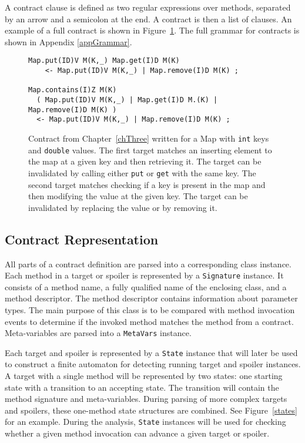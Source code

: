 A contract clause is defined as two regular expressions over methods, separated
by an arrow and a semicolon at the end. A contract is then a list of clauses. An
example of a full contract is shown in Figure~\ref{contract}. The full grammar
for contracts is shown in Appendix \ref{appGrammar}.

\begin{figure}[hbt]
    \label{contract}
    \begin{lstlisting}
Map.put(ID)V M(K,_) Map.get(I)D M(K)
    <- Map.put(ID)V M(K,_) | Map.remove(I)D M(K) ;

Map.contains(I)Z M(K)
  ( Map.put(ID)V M(K,_) | Map.get(I)D M.(K) | Map.remove(I)D M(K) )
  <- Map.put(ID)V M(K,_) | Map.remove(I)D M(K) ;
\end{lstlisting}
    \caption{Contract from Chapter~\ref{chThree} written for a Map with
    \texttt{int} keys and \texttt{double} values. The first target matches an
    inserting element to the map at a given key and then retrieving it. The
    target can be invalidated by calling either \texttt{put} or \texttt{get}
    with the same key. The second target matches checking if a key is present in
    the map and then modifying the value at the given key. The target can be
    invalidated by replacing the value or by removing it.}
\end{figure}

\subsection{Contract Representation}
All parts of a contract definition are parsed into a corresponding class
instance. Each method in a target or spoiler is represented by a
\texttt{Signature} instance. It consists of a method name, a fully qualified
name of the enclosing class, and a method descriptor. The method descriptor
contains information about parameter types. The main purpose of this class is to
be compared with method invocation events to determine if the invoked method
matches the method from a contract. Meta-variables are parsed into a
\texttt{MetaVars} instance.

Each target and spoiler is represented by a \texttt{State} instance that will
later be used to construct a finite automaton for detecting running target and
spoiler instances. A target with a single method will be represented by two
states: one starting state with a transition to an accepting state. The
transition will contain the method signature and meta-variables. During parsing
of more complex targets and spoilers, these one-method state structures are
combined. See Figure~\ref{states} for an example. During the analysis,
\texttt{State} instances will be used for checking whether a given method
invocation can advance a given target or spoiler.

